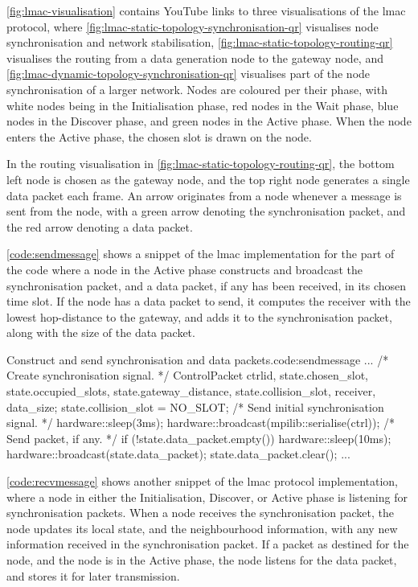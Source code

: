 \autoref{fig:lmac-visualisation} contains YouTube links to three visualisations of the \gls{lmac} protocol,
where \autoref{fig:lmac-static-topology-synchronisation-qr} visualises node synchronisation and network
stabilisation, \autoref{fig:lmac-static-topology-routing-qr} visualises the routing from a data generation
node to the gateway node, and \autoref{fig:lmac-dynamic-topology-synchronisation-qr} visualises part of the
node synchronisation of a larger network. Nodes are coloured per their phase, with white nodes being in the
Initialisation phase, red nodes in the Wait phase, blue nodes in the Discover phase, and green nodes in the
Active phase. When the node enters the Active phase, the chosen slot is drawn on the node. \medbreak

In the routing visualisation in \autoref{fig:lmac-static-topology-routing-qr}, the bottom left node is chosen
as the gateway node, and the top right node generates a single data packet each frame. An arrow originates
from a node whenever a message is sent from the node, with a green arrow denoting the synchronisation packet,
and the red arrow denoting a data packet. \medbreak


\autoref{code:sendmessage} shows a snippet of the \gls{lmac} implementation for the part of the code where a
node in the Active phase constructs and broadcast the synchronisation packet, and a data packet, if any has
been received, in its chosen time slot. If the node has a data packet to send, it computes the receiver with
the lowest hop-distance to the gateway, and adds it to the synchronisation packet, along with the size of the 
data packet.

\begin{cpp}{Construct and send synchronisation and data packets.}{code:sendmessage}
...
/* Create synchronisation signal. */
ControlPacket ctrl{id, state.chosen_slot,
                   state.occupied_slots, state.gateway_distance,
                   state.collision_slot, receiver, data_size};
state.collision_slot = NO_SLOT;
/* Send initial synchronisation signal. */
hardware::sleep(3ms);
hardware::broadcast(mpilib::serialise(ctrl));
/* Send packet, if any. */
if (!state.data_packet.empty()) {
    hardware::sleep(10ms);
    hardware::broadcast(state.data_packet);
    state.data_packet.clear();
}
...
\end{cpp}

\autoref{code:recvmessage} shows another snippet of the \gls{lmac} protocol implementation, where a node in
either the Initialisation, Discover, or Active phase is listening for synchronisation packets. When a node
receives the synchronisation packet, the node updates its local state, and the neighbourhood information, with
any new information received in the synchronisation packet. If a packet as destined for the node, and the node
is in the Active phase, the node listens for the data packet, and stores it for later transmission.
\smallbreak


